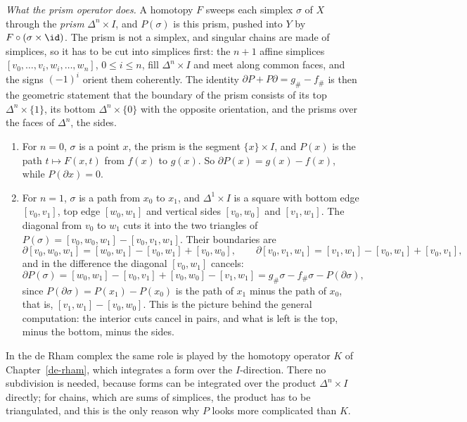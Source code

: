 \begin{remark}\label{singular-homology:remark-prism}
\emph{What the prism operator does.} A homotopy $F$ sweeps each simplex $\sigma$ of $X$ through the \emph{prism} $\Delta^n \times I$, and $P(\sigma)$ is this prism, pushed into $Y$ by $F \circ (\sigma \times \id)$.
The prism is not a simplex, and singular chains are made of simplices, so it has to be cut into simplices first: the $n + 1$ affine simplices $[v_0, \ldots, v_i, w_i, \ldots, w_n]$, $0 \leq i \leq n$, fill
$\Delta^n \times I$ and meet along common faces, and the signs $(-1)^i$ orient them coherently. The identity $\partial P + P\partial = g_\# - f_\#$ is then the geometric statement that the boundary of the prism
consists of its top $\Delta^n \times \{1\}$, its bottom $\Delta^n \times \{0\}$ with the opposite orientation, and the prisms over the faces of $\Delta^n$, the sides.
\begin{enumerate}
\item For $n = 0$, $\sigma$ is a point $x$, the prism is the segment $\{x\} \times I$, and $P(x)$ is the path $t \mapsto F(x, t)$ from $f(x)$ to $g(x)$. So $\partial P(x) = g(x) - f(x)$, while $P(\partial x) = 0$.
\item For $n = 1$, $\sigma$ is a path from $x_0$ to $x_1$, and $\Delta^1 \times I$ is a square with bottom edge $[v_0, v_1]$, top edge $[w_0, w_1]$ and vertical sides $[v_0, w_0]$ and $[v_1, w_1]$. The diagonal from $v_0$ to $w_1$
cuts it into the two triangles of $P(\sigma) = [v_0, w_0, w_1] - [v_0, v_1, w_1]$. Their boundaries are
\[
\partial[v_0, w_0, w_1] = [w_0, w_1] - [v_0, w_1] + [v_0, w_0], \qquad \partial[v_0, v_1, w_1] = [v_1, w_1] - [v_0, w_1] + [v_0, v_1],
\]
and in the difference the diagonal $[v_0, w_1]$ cancels:
\[
\partial P(\sigma) = [w_0, w_1] - [v_0, v_1] + [v_0, w_0] - [v_1, w_1] = g_\#\sigma - f_\#\sigma - P(\partial\sigma),
\]
since $P(\partial\sigma) = P(x_1) - P(x_0)$ is the path of $x_1$ minus the path of $x_0$, that is, $[v_1, w_1] - [v_0, w_0]$. This is the picture behind the general computation: the interior cuts cancel in pairs, and what is
left is the top, minus the bottom, minus the sides.
\end{enumerate}
In the de Rham complex the same role is played by the homotopy operator $K$ of Chapter~\ref{de-rham}, which integrates a form over the $I$-direction. There no subdivision is needed, because forms can be
integrated over the product $\Delta^n \times I$ directly; for chains, which are sums of simplices, the product has to be triangulated, and this is the only reason why $P$ looks more complicated than $K$.
\end{remark}

